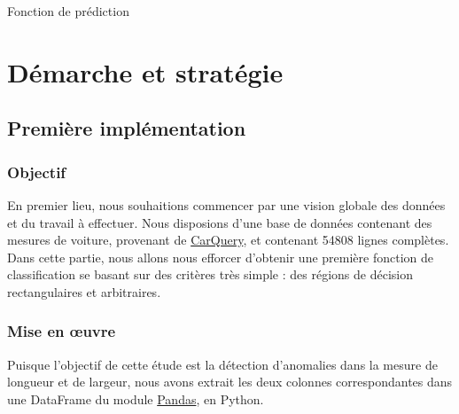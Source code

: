 \documentclass[a4paper]{report}
\begin{document}
\begin{algorithm}[h]
\SetAlgoLined

\medbreak


\medbreak


\medbreak

\caption{Fonction de prédiction\label{alg:prediction}}
\end{algorithm}

\chapter{Démarche et stratégie}

\section{Première implémentation}

\subsection{Objectif}

En premier lieu, nous souhaitions commencer par une vision globale des données et du travail à effectuer. Nous disposions d'une base de données contenant des mesures de voiture, provenant de \href{http://www.carqueryapi.com}{CarQuery}, et contenant 54808 lignes complètes. Dans cette partie, nous allons nous efforcer d'obtenir une première fonction de classification se basant sur des critères très simple : des régions de décision rectangulaires et arbitraires.

\subsection{Mise en {\oe}uvre}

Puisque l'objectif de cette étude est la détection d'anomalies dans la mesure de longueur et de largeur, nous avons extrait les deux colonnes correspondantes dans une DataFrame du module \href{http://pandas.pydata.org}{Pandas}, en Python.
\end{document}
